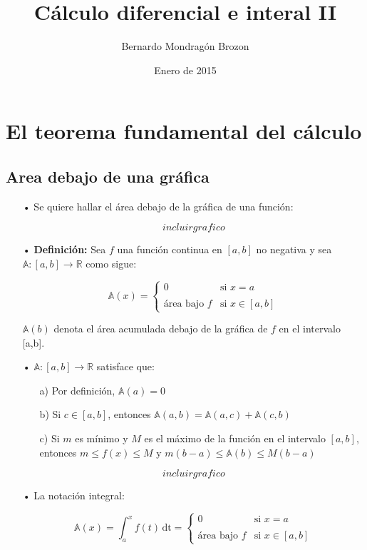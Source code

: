 \documentclass[pts12]{article}
\title{Cálculo diferencial e interal II}
\author{Bernardo Mondragón Brozon}
\date{Enero de 2015}
\numberwithin{equation}{section}
\newcommand{\Col}{\color{ProcessBlue}}
\begin{document}
\maketitle

\section{\Col El teorema fundamental del cálculo}

\subsection{\Col Area debajo de una gráfica}

\begin{itemize}
\item[\Col •] Se quiere hallar el área debajo de la gráfica de una función:

$$ incluir grafico $$

\item[\Col•] \textbf{Definición:} Sea $f$ una función continua en $[a,b]$ no negativa y sea $\mathbb{A}:[a,b]\longrightarrow\mathbb{R}$ como sigue:

$$ \mathbb{A}(x) =
\left\{
    \begin{array}{ll}
        0  & \mbox{si } x=a \\
        \\ \mbox{área bajo $f$} & \mbox{si } x\in [a,b]
    \end{array}
\right.$$

$\mathbb{A}(b)$ denota el área acumulada debajo de la gráfica de $f$ en el intervalo [a,b]. 

\item[\Col •] $\mathbb{A}:[a,b]\longrightarrow\mathbb{R}$ satisface que:

\begin{enumerate}
\item[a)] Por definición, $\mathbb{A}(a)=0$
\item[b)] Si $c\in [a,b]$, entonces $\mathbb{A}(a,b)=\mathbb{A}(a,c)+\mathbb{A}(c,b)$
\item[c)] Si $m$ es mínimo y $M$ es el máximo de la función en el intervalo $[a,b]$, entonces $m\leq f(x)\leq M$ y $m(b-a)\leq \mathbb{A}(b)\leq M(b-a)$ 
\end{enumerate} 

$$ incluir grafico $$

\item[\Col •] La notación integral: 

$$ \mathbb{A}(x)=\int_{a}^{x} \! {f(t)} \, \mathrm{dt} =
\left\{
    \begin{array}{ll}
        0  & \mbox{si } x=a \\
        \\ \mbox{área bajo $f$} & \mbox{si } x\in [a,b]
    \end{array}
\right.$$

\end{itemize}
\end{document}
